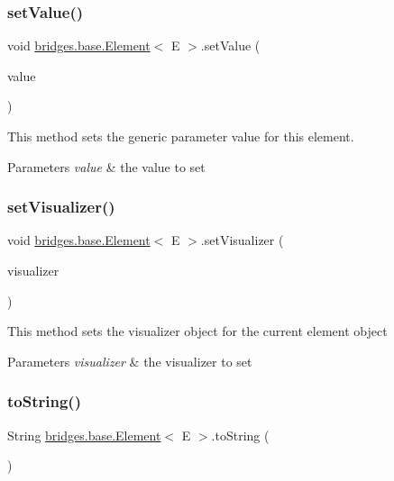 \subsubsection{\texorpdfstring{setValue()}{setValue()}}
{\footnotesize\ttfamily void \mbox{\hyperlink{classbridges_1_1base_1_1_element}{bridges.\+base.\+Element}}$<$ E $>$.set\+Value (\begin{DoxyParamCaption}\item[{E}]{value }\end{DoxyParamCaption})}

This method sets the generic parameter value for this element.


\begin{DoxyParams}{Parameters}
{\em value} & the value to set \\
\hline
\end{DoxyParams}
\mbox{\label{classbridges_1_1base_1_1_element_a5befa95788099f1bc72cdf5361c55bed}} 
\subsubsection{\texorpdfstring{setVisualizer()}{setVisualizer()}}
{\footnotesize\ttfamily void \mbox{\hyperlink{classbridges_1_1base_1_1_element}{bridges.\+base.\+Element}}$<$ E $>$.set\+Visualizer (\begin{DoxyParamCaption}\item[{\mbox{\hyperlink{classbridges_1_1base_1_1_element_visualizer}{Element\+Visualizer}}}]{visualizer }\end{DoxyParamCaption})}

This method sets the visualizer object for the current element object


\begin{DoxyParams}{Parameters}
{\em visualizer} & the visualizer to set \\
\hline
\end{DoxyParams}
\mbox{\label{classbridges_1_1base_1_1_element_a7dc685e317fd9dc2e73e049a9f907e42}} 
\subsubsection{\texorpdfstring{toString()}{toString()}}
{\footnotesize\ttfamily String \mbox{\hyperlink{classbridges_1_1base_1_1_element}{bridges.\+base.\+Element}}$<$ E $>$.to\+String (\begin{DoxyParamCaption}{ }\end{DoxyParamCaption})}

